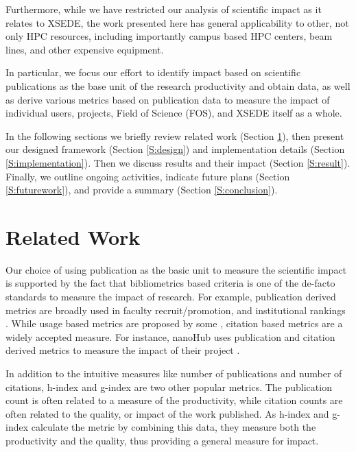 \documentclass{sig-alternate}
\begin{document}
Furthermore, while we have restricted our analysis of scientific impact as it relates to XSEDE, the work presented here has general applicability to other, not only HPC resources, including importantly campus based HPC centers, beam lines, and other expensive equipment.

In particular, we focus our effort to identify impact based on scientific publications as the base unit of the research productivity and obtain data, as well as derive various metrics based on publication data to measure the impact of individual users, projects, Field of Science (FOS), and XSEDE itself as a whole.

In the following sections we briefly review related work (Section \ref{S:related}), then present our designed framework (Section \ref{S:design}) and implementation details (Section \ref{S:implementation}). Then we discuss results and their impact (Section \ref{S:result}). Finally, we outline ongoing activities, indicate future plans (Section \ref{S:futurework}), and provide a summary (Section \ref{S:conclusion}).

\section{Related Work} \label{S:related}
  Our choice of using publication as the basic unit to measure the scientific impact is supported by the fact that bibliometrics based criteria is one of the de-facto standards to measure the impact of research. For example, publication derived metrics are broadly used in faculty recruit/promotion, and institutional rankings \cite{thomas1998institutional}.  While usage based metrics are proposed by some \cite{Bollen:2007:MUM:1255175.1255273,Bollen:2008:TUI:1378889.1378928, bollen2009principal}, citation based metrics are a widely accepted measure. For instance, nanoHub uses publication and citation derived metrics to measure the impact of their project \cite{www-nanohubcite}.

In addition to the intuitive measures like number of publications and number of citations, h-index \cite{hirsch2005index} and g-index \cite{egghe2006theory} are two other popular metrics. The publication count is often related to a measure of the productivity, while citation counts are often related to the quality, or impact of the work published. As h-index and g-index calculate the metric by combining this data, they measure both the productivity and the quality, thus providing a general measure for impact.
\end{document}
